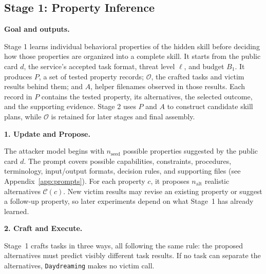 \documentclass[letterpaper,twocolumn,10pt]{article}
\newcommand{\method}{\texttt{Daydreaming}\xspace}
\newcommand{\paragraphtitle}[1]{%
  \vspace{5pt}\noindent\textbf{#1.}%
}
\begin{document}
\subsection{Stage 1: Property Inference}
\label{sec:Stage~1}


\paragraphtitle{Goal and outputs}
Stage 1 learns individual behavioral properties of the hidden skill before deciding how those properties are organized into a complete skill. It starts from the public card $d$, the service’s accepted task format, threat level $\ell$, and budget $B_1$. It produces $P$, a set of tested property records; $\mathcal{O}$, the crafted tasks and victim results behind them; and $A$, helper filenames observed in those results. Each record in $P$ contains the tested property, its alternatives, the selected outcome, and the supporting evidence. Stage 2 uses $P$ and $A$ to construct candidate skill plans, while $\mathcal{O}$ is retained for later stages and final assembly.

\paragraphtitle{1. Update and Propose}
The attacker model begins with $n_{\mathrm{seed}}$ possible properties suggested by the public card $d$. The prompt covers possible capabilities, constraints, procedures, terminology, input/output formats, decision rules, and supporting files (see Appendix~\ref{app:prompts}). For each property $c$, it proposes $n_{\mathrm{alt}}$ realistic alternatives $\mathcal{C}(c)$. New victim results may revise an existing property or suggest a follow-up property, so later experiments depend on what Stage~1 has already learned.

\paragraphtitle{2. Craft and Execute}
Stage~1 crafts tasks in three ways, all following the same rule: the proposed alternatives must predict visibly different task results. If no task can separate the alternatives, \method makes no victim call.
\end{document}
